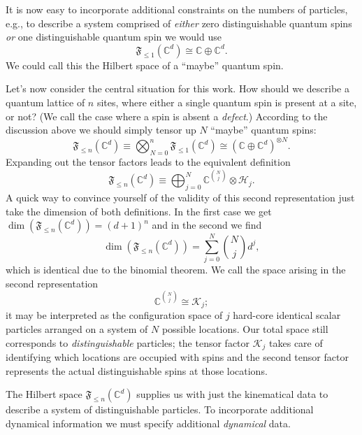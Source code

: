 \documentclass[aps,prx,twocolumn,superscriptaddress,noshowkeys]{revtex4-2}  %
\theoremstyle{plain}%
\theoremstyle{definition}
\theoremstyle{remark}
\begin{document}
It is now easy to incorporate additional constraints on the numbers of particles, e.g., to describe a system comprised of \emph{either} zero distinguishable quantum spins \emph{or} one distinguishable quantum spin we would use
\begin{equation}
\mathfrak{F}_{\le 1} (\mathbb{C}^d) \cong \mathbb{C}\oplus \mathbb{C}^d.
\end{equation}
We could call this the Hilbert space of a ``maybe'' quantum spin.

Let's now consider the central situation for this work. How should we describe a quantum lattice of $n$ sites, where either a single quantum spin is present at a site, or not? (We call the case where a spin is absent a \emph{defect}.) According to the discussion above we should simply tensor up $N$ ``maybe'' quantum spins:
\begin{equation}
\mathfrak{F}_{\le n}(\mathbb{C}^d) \equiv \bigotimes_{N=0}^n \mathfrak{F}_{\le 1}(\mathbb{C}^d) \cong (\mathbb{C}\oplus \mathbb{C}^d)^{\otimes N}.
\end{equation}
Expanding out the tensor factors leads to the equivalent definition
\begin{equation}
\mathfrak{F}_{\le n}(\mathbb{C}^d) \equiv \bigoplus_{j=0}^N \mathbb{C}^{\binom{N}{j}}\otimes \mathcal{H}_j.
\end{equation}
A quick way to convince yourself of the validity of this second representation just take the dimension of both definitions. In the first case we get $\dim(\mathfrak{F}_{\le n}(\mathbb{C}^d)) = (d+1)^n$ and in the second we find
\begin{equation}
\dim(\mathfrak{F}_{\le n}(\mathbb{C}^d)) = \sum_{j=0}^N \binom{N}{j} d^j,
\end{equation}
which is identical due to the binomial theorem. We call the space arising in the second representation
\begin{equation}
\mathbb{C}^{\binom{N}{j}} \cong \mathcal{K}_{j};
\end{equation}
it may be interpreted as the configuration space of $j$ hard-core identical scalar particles arranged on a system of $N$ possible locations. Our total space still corresponds to \emph{distinguishable} particles; the tensor factor $\mathcal{K}_j$ takes care of identifying which locations are occupied with spins and the second tensor factor represents the actual distinguishable spins at those locations.

The Hilbert space $\mathfrak{F}_{\le n}(\mathbb{C}^d)$ supplies us with just the kinematical data to describe a system of distinguishable particles. To incorporate additional dynamical information we must specify additional \emph{dynamical} data.
\end{document}
